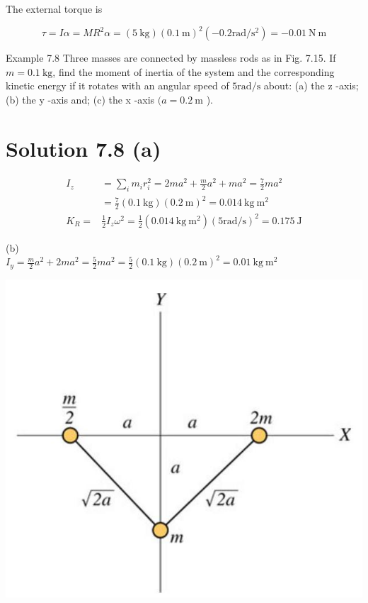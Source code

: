 \documentclass[10pt]{article}
\begin{document}
The external torque is

$$
\tau=I \alpha=M R^{2} \alpha=(5 \mathrm{~kg})(0.1 \mathrm{~m})^{2}\left(-0.2 \mathrm{rad} / \mathrm{s}^{2}\right)=-0.01 \mathrm{~N} \mathrm{~m}
$$

Example 7.8 Three masses are connected by massless rods as in Fig. 7.15. If $m=0.1 \mathrm{~kg}$, find the moment of inertia of the system and the corresponding kinetic energy if it rotates with an angular speed of $5 \mathrm{rad} / \mathrm{s}$ about: (a) the z -axis; (b) the y -axis and; (c) the x -axis $(a=0.2 \mathrm{~m}$ ).

\section*{Solution 7.8 (a)}
$$
\begin{aligned}
I_{z} & =\sum_{i} m_{i} r_{i}^{2}=2 m a^{2}+\frac{m}{2} a^{2}+m a^{2}=\frac{7}{2} m a^{2} \\
& =\frac{7}{2}(0.1 \mathrm{~kg})(0.2 \mathrm{~m})^{2}=0.014 \mathrm{~kg} \mathrm{~m}^{2} \\
K_{R}= & \frac{1}{2} I_{z} \omega^{2}=\frac{1}{2}\left(0.014 \mathrm{~kg} \mathrm{~m}^{2}\right)(5 \mathrm{rad} / \mathrm{s})^{2}=0.175 \mathrm{~J}
\end{aligned}
$$

(b)\\
$I_{y}=\frac{m}{2} a^{2}+2 m a^{2}=\frac{5}{2} m a^{2}=\frac{5}{2}(0.1 \mathrm{~kg})(0.2 \mathrm{~m})^{2}=0.01 \mathrm{~kg} \mathrm{~m}^{2}$

\begin{center}
\includegraphics[max width=\textwidth]{2024_09_13_db1f357d2aad0a03eb2eg-119(1)}
\end{center}
\end{document}
